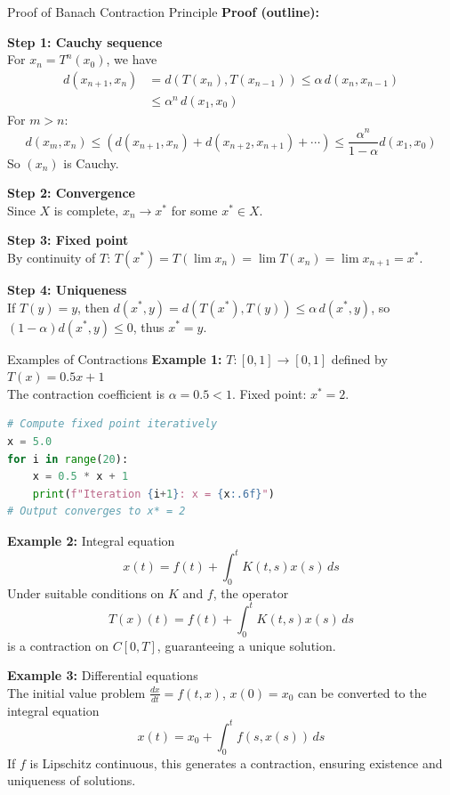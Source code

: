 \documentclass[aspectratio=169,10pt]{beamer}
\begin{document}
\begin{frame}[fragile]{Proof of Banach Contraction Principle}
    \textbf{Proof (outline):}

    \vspace{0.3cm}
    \textbf{Step 1: Cauchy sequence} \\
    For $x_n = T^n(x_0)$, we have
    \begin{align*}
        d(x_{n+1}, x_n) &= d(T(x_n), T(x_{n-1})) \leq \alpha \, d(x_n, x_{n-1}) \\
        &\leq \alpha^n \, d(x_1, x_0)
    \end{align*}
    For $m > n$:
    \[
        d(x_m, x_n) \leq (d(x_{n+1}, x_n) + d(x_{n+2}, x_{n+1}) + \cdots) \leq \frac{\alpha^n}{1-\alpha} d(x_1, x_0)
    \]
    So $(x_n)$ is Cauchy.

    \vspace{0.3cm}
    \textbf{Step 2: Convergence} \\
    Since $X$ is complete, $x_n \to x^*$ for some $x^* \in X$.

    \vspace{0.3cm}
    \textbf{Step 3: Fixed point} \\
    By continuity of $T$: $T(x^*) = T(\lim x_n) = \lim T(x_n) = \lim x_{n+1} = x^*$.

    \vspace{0.3cm}
    \textbf{Step 4: Uniqueness} \\
    If $T(y) = y$, then $d(x^*, y) = d(T(x^*), T(y)) \leq \alpha \, d(x^*, y)$, so $(1-\alpha) d(x^*, y) \leq 0$, thus $x^* = y$.
\end{frame}

\begin{frame}[fragile]{Examples of Contractions}
    \textbf{Example 1:} $T: [0,1] \to [0,1]$ defined by $T(x) = 0.5x + 1$ \\
    The contraction coefficient is $\alpha = 0.5 < 1$. Fixed point: $x^* = 2$.

    \vspace{0.3cm}
    \begin{lstlisting}[language=Python]
# Compute fixed point iteratively
x = 5.0
for i in range(20):
    x = 0.5 * x + 1
    print(f"Iteration {i+1}: x = {x:.6f}")
# Output converges to x* = 2
    \end{lstlisting}

    \vspace{0.3cm}
    \textbf{Example 2:} Integral equation
    \[
        x(t) = f(t) + \int_0^t K(t,s) x(s) \, ds
    \]
    Under suitable conditions on $K$ and $f$, the operator
    \[
        T(x)(t) = f(t) + \int_0^t K(t,s) x(s) \, ds
    \]
    is a contraction on $C[0, T]$, guaranteeing a unique solution.

    \vspace{0.3cm}
    \textbf{Example 3:} Differential equations \\
    The initial value problem $\frac{dx}{dt} = f(t,x)$, $x(0) = x_0$ can be converted to the integral equation
    \[
        x(t) = x_0 + \int_0^t f(s, x(s)) \, ds
    \]
    If $f$ is Lipschitz continuous, this generates a contraction, ensuring existence and uniqueness of solutions.
\end{frame}
\end{document}
